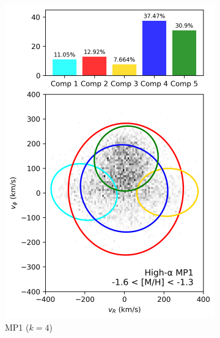 \documentclass[a4paper,12pt]{article}
\begin{document}
\begin{figure}[H]
\begin{subfigure}{0.245\linewidth}
    \includegraphics[width=\linewidth]{../figures/gmm_mp1_high_alpha_k5.png}
    \caption{MP1 ($k{=}4$)}
    \label{fig:mp1_hi}
  \end{subfigure}\hfill
  \begin{subfigure}{0.245\linewidth}

\end{subfigure}
\end{figure}
\end{document}
